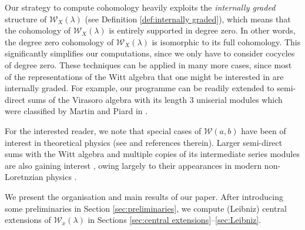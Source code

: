 \documentclass[11pt, svgnames]{amsart}
\newcommand{\W}{\mathcal{W}}
\theoremstyle{definition}
\begin{document}
Our strategy to compute cohomology heavily exploits the \emph{internally graded} structure of $\W_X(\lambda)$ (see Definition \ref{def:internally graded}), which means that the cohomology of $\W_X(\lambda)$ is entirely supported in degree zero. In other words, the degree zero cohomology of $\W_X(\lambda)$ is isomorphic to its full cohomology. This significantly simplifies our computations, since we only have to consider cocycles of degree zero. These techniques can be applied in many more cases, since most of the representations of the Witt algebra that one might be interested in are internally graded. For example, our programme can be readily extended to semi-direct sums of the Virasoro algebra with its length 3 uniserial modules which were classified by Martin and Piard in \cite{MartinPiard2}.

For the interested reader, we note that special cases of $\W(a,b)$ have been of interest in theoretical physics (see \cite{BondivdBurgMetzner, BrownHenneaux, FarahmandSafariSheikhJabbari, GPSJTZ, BBBM, FigueroaVishwa} and references therein). Larger semi-direct sums with the Witt algebra and multiple copies of its intermediate series modules are also gaining interest \cite{GaoLiuPei, BatlleCarlesCampelloGomis, BatlleFigueroaGomisVishwa}, owing largely to their appearances in modern non-Loretnzian physics \cite{BagchiGopakumar, Aizawa}.

We present the organisation and main results of our paper. After introducing some preliminaries in Section \ref{sec:preliminaries}, we compute (Leibniz) central extensions of $\W_x(\lambda)$ in Sections \ref{sec:central extensions}--\ref{sec:Leibniz}.
\end{document}

